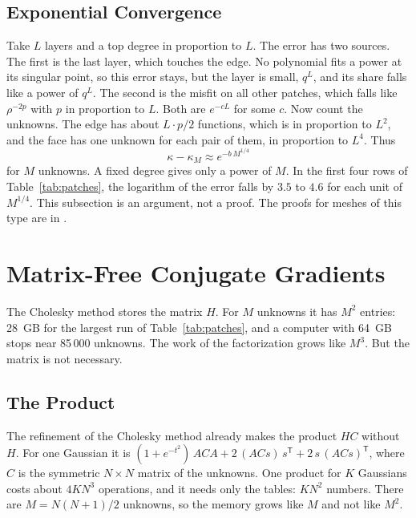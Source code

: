 \documentclass[journal]{IEEEtran}
\newcommand{\T}{\mathsf T}
\begin{document}
\subsection{Exponential Convergence}
Take $L$ layers and a top degree in proportion to $L$. The error has two sources. The first is the last layer, which touches the edge. No polynomial fits a power at its singular point, so this error stays, but the layer is small, $q^{L}$, and its share falls like a power of $q^{L}$. The second is the misfit on all other patches, which falls like $\rho^{-2p}$ with $p$ in proportion to $L$. Both are $e^{-cL}$ for some $c$. Now count the unknowns. The edge has about $L \cdot p/2$ functions, which is in proportion to $L^2$, and the face has one unknown for each pair of them, in proportion to $L^4$. Thus
\begin{equation}
\kappa - \kappa_M \approx e^{-b\, M^{1/4}}
\label{eq:exponential}
\end{equation}
for $M$ unknowns. A fixed degree gives only a power of $M$. In the first four rows of Table~\ref{tab:patches}, the logarithm of the error falls by $3.5$ to $4.6$ for each unit of $M^{1/4}$. This subsection is an argument, not a proof. The proofs for meshes of this type are in \cite{babuska,heuer}.

\section{Matrix-Free Conjugate Gradients}
The Cholesky method stores the matrix $H$. For $M$ unknowns it has $M^2$ entries: 28~GB for the largest run of Table~\ref{tab:patches}, and a computer with 64~GB stops near 85\,000 unknowns. The work of the factorization grows like $M^3$. But the matrix is not necessary.

\subsection{The Product}
The refinement of the Cholesky method already makes the product $HC$ without $H$. For one Gaussian it is $(1 + e^{-t^2})\,A C A + 2\,(A C s)\,s^{\T} + 2\,s\,(A C s)^{\T}$, where $C$ is the symmetric $N\times N$ matrix of the unknowns. One product for $K$ Gaussians costs about $4KN^3$ operations, and it needs only the tables: $KN^2$ numbers. There are $M = N(N+1)/2$ unknowns, so the memory grows like $M$ and not like $M^2$.
\end{document}
